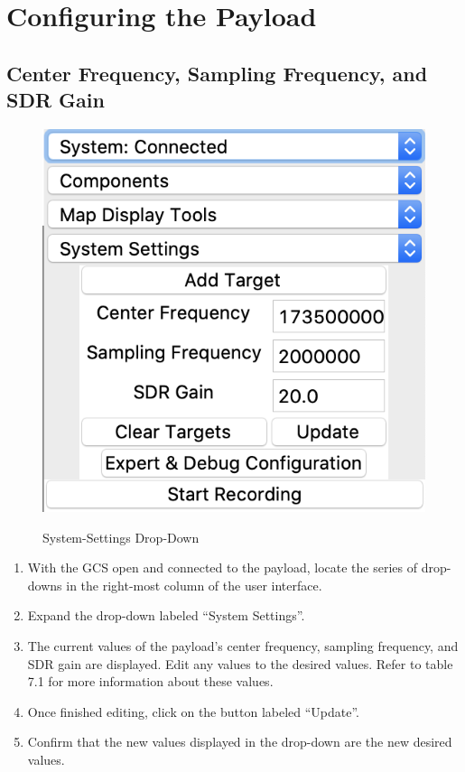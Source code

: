 \documentclass{report}
\begin{document}
	\section{Configuring the Payload}
		\subsection{Center Frequency, Sampling Frequency, and SDR Gain}
			\begin{figure}[htb]
				\centering
				\caption{System-Settings Drop-Down}
				\includegraphics[scale=0.5]{system_settings_dd.jpg}
				\label{fig:system_settings_dd}
			\end{figure}
			\begin{enumerate}
				\item With the GCS open and connected to the payload, locate the series of drop-downs in the right-most column of the user interface.
				\item Expand the drop-down labeled ``System Settings''.
				\item The current values of the payload's center frequency, sampling frequency, and SDR gain are displayed. Edit any values to the desired values. Refer to table 7.1 for more information about these values.
				\item Once finished editing, click on the button labeled ``Update''. 
				\item Confirm that the new values displayed in the drop-down are the new desired values.
			\end{enumerate}
\end{document}

